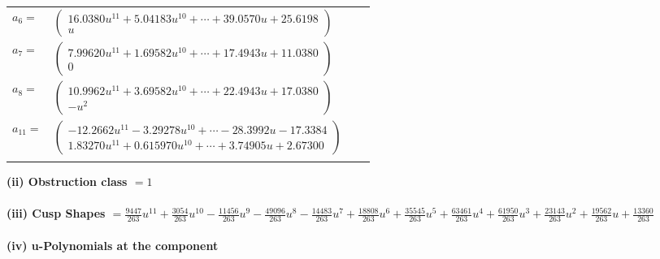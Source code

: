 \documentclass[1p]{elsarticle_modified}
\theoremstyle{definition}
\begin{document}
\begin{tabular}{m{7pt} m{180pt} m{7pt} m{180pt} }
\flushright $a_{6}=$&$\begin{pmatrix}16.0380 u^{11}+5.04183 u^{10}+\cdots+39.0570 u+25.6198\\u\end{pmatrix}$ \\
\flushright $a_{7}=$&$\begin{pmatrix}7.99620 u^{11}+1.69582 u^{10}+\cdots+17.4943 u+11.0380\\0\end{pmatrix}$ \\
\flushright $a_{8}=$&$\begin{pmatrix}10.9962 u^{11}+3.69582 u^{10}+\cdots+22.4943 u+17.0380\\- u^2\end{pmatrix}$ \\
\flushright $a_{11}=$&$\begin{pmatrix}-12.2662 u^{11}-3.29278 u^{10}+\cdots-28.3992 u-17.3384\\1.83270 u^{11}+0.615970 u^{10}+\cdots+3.74905 u+2.67300\end{pmatrix}$\\&\end{tabular}
\flushleft \textbf{(ii) Obstruction class $= 1$}\\~\\
\flushleft \textbf{(iii) Cusp Shapes $= \frac{9447}{263} u^{11}+\frac{3054}{263} u^{10}-\frac{11456}{263} u^9-\frac{49096}{263} u^8-\frac{14483}{263} u^7+\frac{18808}{263} u^6+\frac{35545}{263} u^5+\frac{63461}{263} u^4+\frac{61950}{263} u^3+\frac{23143}{263} u^2+\frac{19562}{263} u+\frac{13360}{263}$}\\~\\
\newpage\renewcommand{\arraystretch}{1}
\flushleft \textbf{(iv) u-Polynomials at the component}\newline \\
\end{document}
